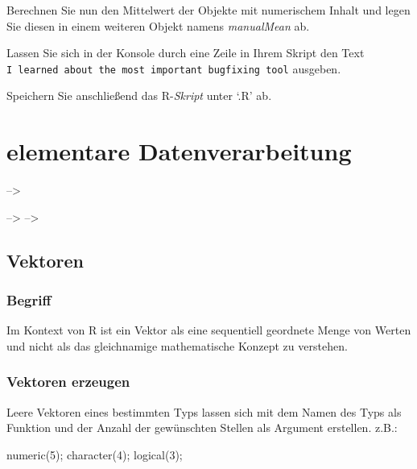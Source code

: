 \documentclass[
]{book}
\newenvironment{Shaded}{\begin{snugshade}}{\end{snugshade}}
\newcommand{\DecValTok}[1]{\textcolor[rgb]{0.00,0.00,0.81}{#1}}
\newcommand{\FunctionTok}[1]{\textcolor[rgb]{0.00,0.00,0.00}{#1}}
\newcommand{\NormalTok}[1]{#1}
\begin{document}
Berechnen Sie nun den Mittelwert der Objekte mit numerischem Inhalt und legen Sie diesen in einem weiteren Objekt namens \emph{manualMean} ab.

Lassen Sie sich in der Konsole durch eine Zeile in Ihrem Skript den Text \texttt{\textquotesingle{}I\ learned\ about\ the\ most\ important\ bugfixing\ tool\textquotesingle{}} ausgeben.

Speichern Sie anschließend das R-\emph{Skript} unter `.R' ab.

\hypertarget{elementare-datenverarbeitung}{%
\chapter{elementare Datenverarbeitung}\label{elementare-datenverarbeitung}}

--\textgreater{}

--\textgreater{}
--\textgreater{}

\hypertarget{vektoren}{%
\section{Vektoren}\label{vektoren}}

\hypertarget{begriff}{%
\subsection{Begriff}\label{begriff}}

Im Kontext von R ist ein Vektor als eine sequentiell geordnete Menge von Werten und nicht als das gleichnamige mathematische Konzept zu verstehen.

\hypertarget{vektoren-erzeugen}{%
\subsection{Vektoren erzeugen}\label{vektoren-erzeugen}}

Leere Vektoren eines bestimmten Typs lassen sich mit dem Namen des Typs als Funktion und der Anzahl der gewünschten Stellen als Argument erstellen. z.B.:

\begin{Shaded}
\begin{Highlighting}[]
\FunctionTok{numeric}\NormalTok{(}\DecValTok{5}\NormalTok{);}
\FunctionTok{character}\NormalTok{(}\DecValTok{4}\NormalTok{);}
\FunctionTok{logical}\NormalTok{(}\DecValTok{3}\NormalTok{);}
\end{Highlighting}
\end{Shaded}
\end{document}
